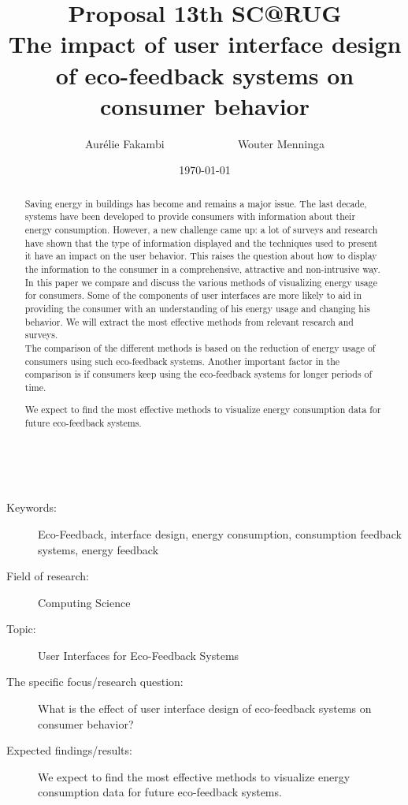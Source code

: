 \documentclass[a4paper]{article}
\title{\textsf{Proposal 13th SC@RUG \\ The impact of user interface design of eco-feedback systems on consumer behavior}}
\author{Aur\'{e}lie Fakambi ~~~~~~~~~~~~ Wouter Menninga}
\date{\today}
\begin{document}
\maketitle

\begin{abstract}
Saving energy in buildings has become and remains a major issue. The last decade, systems have been developed to provide consumers with information about their energy consumption. However, a new challenge came up:
a lot of surveys and research have shown that the type of information displayed and the techniques used to present it have an impact on the user behavior. This raises the question about how to display the information to the consumer in a comprehensive, attractive and non-intrusive way. \\

In this paper we compare and discuss the various methods of visualizing energy usage for consumers. Some of the components of user interfaces are more likely to aid in providing the consumer with an understanding of his energy usage and changing his behavior.
We will extract the most effective methods from relevant research and surveys. \\

The comparison of the different methods is based on the reduction of energy usage of consumers using such eco-feedback systems. Another important factor in the comparison is if consumers keep using the eco-feedback systems for longer periods of time.

We expect to find the most effective methods to visualize energy consumption data for future eco-feedback systems.

\end{abstract}
~\\[0.5cm]
\begin{description}
\item[Keywords:] Eco-Feedback, interface design, energy consumption, consumption feedback systems, energy feedback

\item[Field of research:] Computing Science

\item[Topic:] User Interfaces for Eco-Feedback Systems

\item[The specific focus/research question:] What is the effect of user interface design of eco-feedback systems on consumer behavior?

\item[Expected findings/results:] We expect to find the most effective methods to visualize energy consumption data for future eco-feedback systems.
\end{description}
\end{document}

